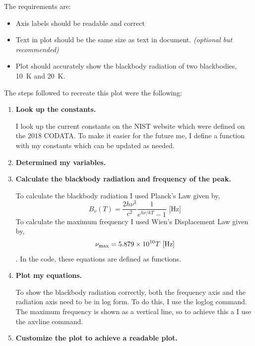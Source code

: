 The requirements are:

\begin{itemize}
    \item Axis labels should be readable and correct
    \item Text in plot should be the same size as text in document. \textit{(optional but recommended)}
    \item Plot should accurately show the blackbody radiation of two blackbodies, \SI{10}{\kelvin} and \SI{20}{\kelvin}.
\end{itemize}

The steps followed to recreate this plot were the following:
\begin{enumerate}
    \item \textbf{Look up the constants.}
    
     I look up the current constants on the NIST website which were defined on the 2018 CODATA. To make it easier for the future me, I define a function with my constants which can be updated as needed.
     
    \item \textbf{Determined my variables.}
    
    \item \textbf{Calculate the blackbody radiation and frequency of the peak.}
    
    To calculate the blackbody radiation I used Planck's Law given by,
        \begin{equation}
        B_\nu(T) = \frac{2h\nu^3}{c^2}\frac{1}{e^{h\nu /kT}-1} \mbox{ [Hz]}
        \label{eq:Plancks}
        \end{equation}
    To calculate the maximum frequency I used Wien's Displacement Law given by,
        \begin{equation}
         \nu_{\rm{max}} = 5.879\times 10^{10} T \mbox{ [\si{\hertz}]}
        \label{eq:WienDisp}
        \end{equation}. 
    In the code, these equations are defined as functions.
    
    \item \textbf{Plot my equations.}
    
    To show the blackbody radiation correctly, both the frequency axis and the radiation axis need to be in log form. To do this, I use the loglog command. 
    The maximum frequency is shown as a vertical line, so to achieve this a I use the axvline command.
    
    \item \textbf{Customize the plot to achieve a readable plot.}
    

\end{enumerate}
